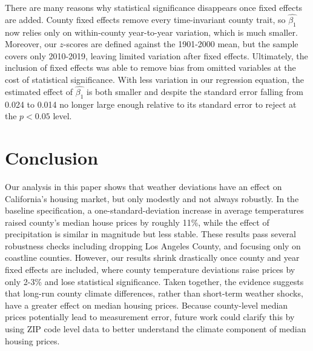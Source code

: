 \documentclass[12pt,reqno]{amsart}
\theoremstyle{definition}
\begin{document}
    There are many reasons why statistical significance disappears once fixed effects are added. County fixed effects remove every time-invariant county trait, so $\widehat{\beta_1}$ now relies only on within-county year-to-year variation, which is much smaller. Moreover, our $z$-scores are defined against the 1901-2000 mean, but the sample covers only 2010-2019, leaving limited variation after fixed effects. Ultimately, the inclusion of fixed effects was able to remove bias from omitted variables at the cost of statistical significance. With less variation in our regression equation, the estimated effect of $\widehat{\beta_1}$ is both smaller and \textemdash despite the standard error falling from 0.024 to 0.014 \textemdash no longer large enough relative to its standard error to reject at the $p < 0.05$ level.
\section{Conclusion}

    Our analysis in this paper shows that weather deviations have an effect on California's housing market, but only modestly and not always robustly. In the baseline specification, a one-standard-deviation increase in average temperatures raised county's median house prices by roughly 11\%, while the effect of precipitation is similar in magnitude but less stable. These results pass several robustness checks \textemdash including dropping Los Angeles County, and focusing only on coastline counties. However, our results shrink drastically once county and year fixed effects are included, where county temperature deviations raise prices by only 2-3\% and lose statistical significance. Taken together, the evidence suggests that long-run county climate differences, rather than short-term weather shocks, have a greater effect on median housing prices. Because county-level median prices potentially lead to measurement error, future work could clarify this by using ZIP code level data to better understand the climate component of median housing prices.


\end{document}
